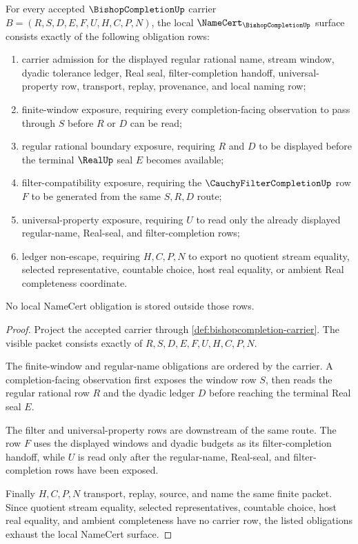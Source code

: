 \begin{theorem}
\label{thm:bishopcompletion-namecert-obligations}
For every accepted $\BishopCompletionUp$ carrier $B=(R,S,D,E,F,U,H,C,P,N)$, the local $\NameCert_{\BishopCompletionUp}$ surface consists exactly of the following obligation rows:
\begin{enumerate}
\item carrier admission for the displayed regular rational name, stream window, dyadic tolerance ledger, Real seal, filter-completion handoff, universal-property row, transport, replay, provenance, and local naming row;
\item finite-window exposure, requiring every completion-facing observation to pass through $S$ before $R$ or $D$ can be read;
\item regular rational boundary exposure, requiring $R$ and $D$ to be displayed before the terminal $\RealUp$ seal $E$ becomes available;
\item filter-compatibility exposure, requiring the $\CauchyFilterCompletionUp$ row $F$ to be generated from the same $S,R,D$ route;
\item universal-property exposure, requiring $U$ to read only the already displayed regular-name, Real-seal, and filter-completion rows;
\item ledger non-escape, requiring $H,C,P,N$ to export no quotient stream equality, selected representative, countable choice, host real equality, or ambient Real completeness coordinate.
\end{enumerate}
No local NameCert obligation is stored outside those rows.
\end{theorem}
\begin{proof}
Project the accepted carrier through \autoref{def:bishopcompletion-carrier}. The visible packet consists exactly of $R,S,D,E,F,U,H,C,P,N$.

The finite-window and regular-name obligations are ordered by the carrier. A completion-facing observation first exposes the window row $S$, then reads the regular rational row $R$ and the dyadic ledger $D$ before reaching the terminal Real seal $E$.

The filter and universal-property rows are downstream of the same route. The row $F$ uses the displayed windows and dyadic budgets as its filter-completion handoff, while $U$ is read only after the regular-name, Real-seal, and filter-completion rows have been exposed.

Finally $H,C,P,N$ transport, replay, source, and name the same finite packet. Since quotient stream equality, selected representatives, countable choice, host real equality, and ambient completeness have no carrier row, the listed obligations exhaust the local NameCert surface.
\end{proof}

